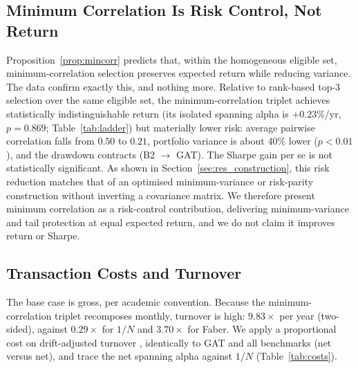 \subsection{Minimum Correlation Is Risk Control, Not Return}
\label{sec:res_mincorr}

Proposition~\ref{prop:mincorr} predicts that, within the homogeneous eligible set,
minimum-correlation selection preserves expected return while reducing variance.
The data confirm exactly this, and nothing more. Relative to rank-based top-3
selection over the same eligible set, the minimum-correlation triplet achieves
statistically indistinguishable return (its isolated spanning alpha is $+0.23\%$/yr,
$p = 0.869$; Table~\ref{tab:ladder}) but materially lower risk: average pairwise
correlation falls from $0.50$ to $0.21$, portfolio variance is about $40\%$ lower
($p < 0.01$), and the drawdown contracts (B2 $\to$ GAT). The Sharpe gain per se is
not statistically significant. As shown in Section~\ref{sec:res_construction}, this
risk reduction matches that of an optimised minimum-variance or risk-parity
construction without inverting a covariance matrix. We therefore present minimum
correlation as a risk-control contribution, delivering minimum-variance and
tail protection at equal expected return, and we do not claim it improves return or
Sharpe.

\subsection{Transaction Costs and Turnover}
\label{sec:res_costs}

The base case is gross, per academic convention. Because the minimum-correlation
triplet recomposes monthly, turnover is high: $9.83\times$ per year (two-sided),
against $0.29\times$ for $1/N$ and $3.70\times$ for Faber. We apply a proportional
cost on drift-adjusted turnover \citep{demiguel2009}, identically to GAT and all
benchmarks (net versus net), and trace the net spanning alpha against $1/N$
(Table~\ref{tab:costs}).

